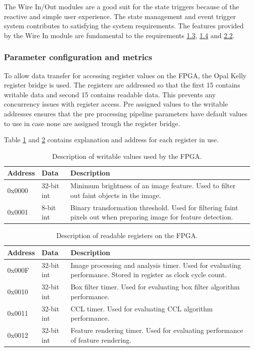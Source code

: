 \documentclass[12pt]{report}
\begin{document}
The Wire In/Out modules are a good suit for the state triggers because of the reactive and simple user experience.
The state management and event trigger system contributes to satisfying the system requirements. The features provided by the Wire In module are fundamental to the requirements \hyperref[req1.3]{1.3}, \hyperref[req1.4]{1.4} and \hyperref[req2.2]{2.2}.

\subsubsection{Parameter configuration and metrics}
To allow data transfer for accessing register values on the FPGA, the Opal Kelly register bridge is used. The registers are addressed so that the first 15 contains writable data and second 15 contains readable data. This prevents any concurrency issues with register access. Pre assigned values to the writable addresses ensures that the pre processing pipeline parameters have default values to use in case none are assigned trough the register bridge.
\par
Table \ref{table:regs1} and \ref{table:regs2} contains explanation and address for each register in use.

\begin{table}[h]
    \begin{tabular}{|p{2cm}|p{2cm}|p{9cm}|}
        \hline
        \textbf{Address}&\textbf{Data}&\textbf{Description}\\
        \hline
        0x0000&32-bit int&Minimum brightness of an image feature. Used to filter out faint objects in the image.\\
        \hline
        0x0001&8-bit int&Binary transformation threshold. Used for filtering faint pixels out when preparing image for feature detection.\\ 
        \hline
    \end{tabular}
    \caption{Description of writable values used by the FPGA.}
    \label{table:regs1}
\end{table}

\begin{table}[h]
    \begin{tabular}{|p{2cm}|p{2cm}|p{9cm}|}
        \hline
        \textbf{Address}&\textbf{Data}&\textbf{Description}\\
        \hline
        0x000F&32-bit int&Image processing and analysis timer. Used for evaluating performance. Stored in register as clock cycle count.\\
        \hline
        0x0010&32-bit int&Box filter timer. Used for evaluating box filter algorithm performance.\\ 
        \hline
        0x0011&32-bit int&CCL timer. Used for evaluating CCL algorithm performance.\\
        \hline
        0x0012&32-bit int&Feature rendering timer. Used for evaluating performance of feature rendering.\\
        \hline
    \end{tabular}
    \caption{Description of readable registers on the FPGA.}
    \label{table:regs2}
\end{table}
\end{document}
